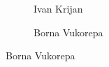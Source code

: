 \begin{frame}[plain]
\begin{figure}[h]
\begin{subfigure}{0.23\textwidth}
	\caption{\scriptsize Ivan Krijan}
	\end{subfigure}
	\begin{subfigure}{0.30\textwidth}
	\captionsetup{labelformat=empty}
	\centering
	\caption{\scriptsize Borna Vukorepa}
	\end{subfigure}
	\end{figure}
\end{frame}



